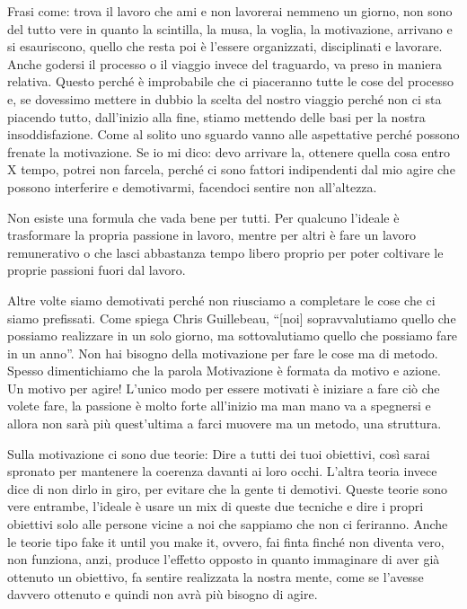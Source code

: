 \documentclass[12pt]{book} %
\begin{document}
\begin{mdframed}[linewidth=1pt]
Frasi come: trova il lavoro che ami e non lavorerai nemmeno un giorno, non sono del tutto vere in quanto la scintilla,
la musa, la voglia, la motivazione, arrivano e si esauriscono, quello che resta poi è l'essere organizzati,
disciplinati e lavorare. Anche godersi il processo o il viaggio invece del traguardo, va preso in maniera relativa.
Questo perché è improbabile che ci piaceranno tutte le cose del processo e, se dovessimo mettere in dubbio la scelta
del nostro viaggio perché non ci sta piacendo tutto, dall'inizio alla fine, stiamo mettendo delle
basi per la nostra insoddisfazione. Come al solito uno sguardo vanno alle aspettative perché possono frenate la
motivazione. Se io mi dico: devo arrivare la, ottenere quella cosa entro X tempo, potrei non farcela, perché ci sono
fattori indipendenti dal mio agire che possono interferire e demotivarmi, facendoci sentire non all'altezza.

Non esiste una formula che vada bene per tutti. Per qualcuno l'ideale è trasformare la propria
passione in lavoro, mentre per altri è fare un lavoro remunerativo o che lasci abbastanza tempo libero proprio per
poter coltivare le proprie passioni fuori dal lavoro.

Altre volte siamo demotivati perché non riusciamo a completare le cose che ci siamo prefissati. Come spiega Chris
Guillebeau, “[noi] sopravvalutiamo quello che possiamo realizzare in un solo giorno, ma sottovalutiamo quello che
possiamo fare in un anno”. Non hai bisogno della motivazione per fare le cose ma di metodo. Spesso dimentichiamo che la
parola Motivazione è formata da motivo e azione. Un motivo per agire! L'unico modo per essere motivati è iniziare a
fare ciò che volete fare, la passione è molto forte all'inizio ma man mano va a spegnersi e allora
non sarà più quest'ultima a farci muovere ma un metodo, una struttura.

Sulla motivazione ci sono due teorie: 
Dire a tutti dei tuoi obiettivi, così sarai spronato per mantenere la coerenza davanti ai loro occhi.
L'altra teoria invece dice di non dirlo in giro, per evitare che la gente ti demotivi. Queste teorie sono vere entrambe, l'ideale è usare un mix di queste due tecniche e dire i propri obiettivi solo alle persone vicine a noi che sappiamo che non ci feriranno.
Anche le teorie tipo fake it until you make it, ovvero, fai finta finché non diventa vero, non funziona, anzi, produce l'effetto opposto in quanto immaginare di aver già ottenuto un obiettivo, fa sentire realizzata la nostra mente, come se l'avesse davvero ottenuto e quindi non avrà più bisogno di agire.


\end{mdframed}
\end{document}
